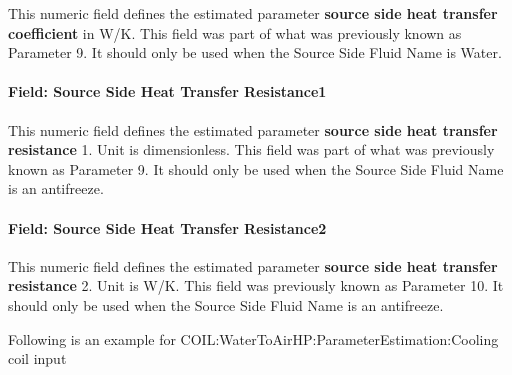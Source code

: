 This numeric field defines the estimated parameter \textbf{source side heat transfer coefficient} in W/K. This field was part of what was previously known as Parameter 9. It should only be used when the Source Side Fluid Name is Water.

\paragraph{Field: Source Side Heat Transfer Resistance1}\label{field-source-side-heat-transfer-resistance1}

This numeric field defines the estimated parameter \textbf{source side heat transfer resistance} 1. Unit is dimensionless. This field was part of what was previously known as Parameter 9. It should only be used when the Source Side Fluid Name is an antifreeze.

\paragraph{Field: Source Side Heat Transfer Resistance2}\label{field-source-side-heat-transfer-resistance2}

This numeric field defines the estimated parameter \textbf{source side heat transfer resistance} 2. Unit is W/K. This field was previously known as Parameter 10. It should only be used when the Source Side Fluid Name is an antifreeze.

Following is an example for COIL:WaterToAirHP:ParameterEstimation:Cooling coil input

